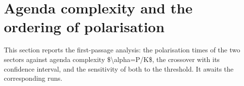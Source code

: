 \section{Agenda complexity and the ordering of polarisation}
\label{sec:agenda}

\num{This section reports the first-passage analysis: the polarisation times of
the two sectors against agenda complexity $\alpha=P/K$, the crossover with its
confidence interval, and the sensitivity of both to the threshold. It awaits the
corresponding runs.}
